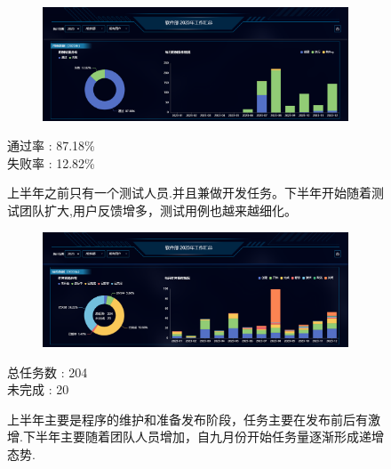 \documentclass[AutoFakeBold,AutoFakeSlant]{beamer}
\begin{document}
	\begin{frame}[fragile]
		\begin{figure}
			\centering %
			\begin{subfigure}{\linewidth}
				\includegraphics[width=\linewidth]{Case}
			\end{subfigure}
			
			\begin{minipage}[l]{0.3\linewidth}
				\large
				通过率 : 87.18\% \\
				失败率 : 12.82\%
			\end{minipage}\hfill
			\begin{minipage}[l]{0.6\linewidth}
			\footnotesize
			上半年之前只有一个测试人员.并且兼做开发任务。下半年开始随着测试团队扩大,用户反馈增多，测试用例也越来越细化。
			\end{minipage}
		\end{figure} 
	\end{frame}
	
	\begin{frame}[fragile]
		\begin{figure}
			\centering %
			\begin{subfigure}{\linewidth}
				\includegraphics[width=\linewidth]{Task}
			\end{subfigure} 
			
			\begin{minipage}[l]{0.3\linewidth}
				\large
				总任务数 : 204 \\
				未完成  : 20
			\end{minipage}\hfill
			\begin{minipage}[l]{0.6\linewidth}
				\footnotesize
				上半年主要是程序的维护和准备发布阶段，任务主要在发布前后有激增.下半年主要随着团队人员增加，自九月份开始任务量逐渐形成递增态势.
			\end{minipage}
		\end{figure}
	\end{frame}
	
\end{document}
